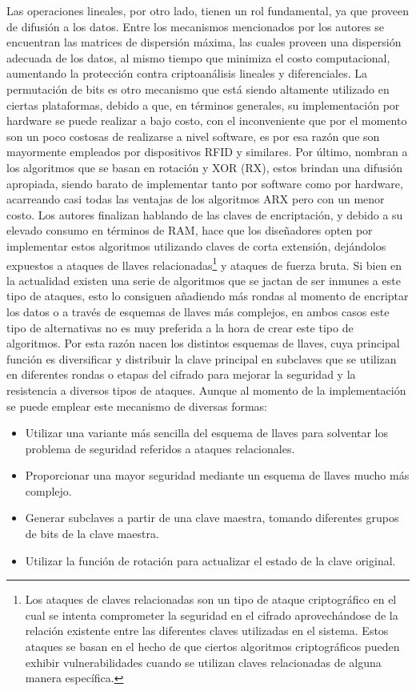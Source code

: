 \documentclass[a4paper,10pt]{article}
\begin{document}
	Las operaciones lineales, por otro lado, tienen un rol fundamental, ya que proveen de difusión a los datos. Entre los mecanismos mencionados por los autores se encuentran las matrices de dispersión máxima, las cuales proveen una dispersión adecuada de los datos, al mismo tiempo que minimiza el costo computacional, aumentando la protección contra criptoanálisis lineales y diferenciales. La permutación de bits es otro mecanismo que está siendo altamente utilizado en ciertas plataformas, debido a que, en términos generales, su implementación por hardware se puede realizar a bajo costo, con el inconveniente que por el momento son un poco costosas de realizarse a nivel software, es por esa razón que son mayormente empleados por dispositivos RFID y similares. Por último, nombran a los algoritmos que se basan en rotación y XOR (RX), estos brindan una difusión apropiada, siendo barato de implementar tanto por software como por hardware, acarreando casi todas las ventajas de los algoritmos ARX pero con un menor costo.
	Los autores finalizan hablando de las claves de encriptación, y debido a su elevado consumo en términos de RAM, hace que los diseñadores opten por implementar estos algoritmos utilizando claves de corta extensión, dejándolos 
	expuestos a ataques de llaves relacionadas\footnote{Los ataques de claves relacionadas son un tipo de ataque criptográfico en el cual se intenta comprometer la seguridad en el cifrado aprovechándose de la relación existente entre las diferentes claves utilizadas en el sistema. Estos ataques se basan en el hecho de que ciertos algoritmos criptográficos pueden exhibir vulnerabilidades cuando se utilizan claves relacionadas de alguna manera específica.} y ataques de fuerza bruta. Si bien en la actualidad existen una serie de algoritmos que se jactan de ser inmunes a este tipo de ataques, esto lo consiguen añadiendo más rondas al momento de encriptar los datos o a través de esquemas de llaves más complejos, en ambos casos este tipo de alternativas no es muy preferida a la hora de crear este tipo de algoritmos. Por esta razón nacen los distintos esquemas de llaves, cuya principal función es diversificar y distribuir la clave principal en subclaves que se utilizan en diferentes rondas o etapas del cifrado para mejorar la seguridad y la resistencia a diversos tipos de ataques. Aunque al momento de la implementación se puede emplear este mecanismo de diversas formas:
	\begin{itemize}
		\item Utilizar una variante más sencilla del esquema de llaves para solventar los problema de seguridad referidos a ataques relacionales.
		\item Proporcionar una mayor seguridad mediante un esquema de llaves mucho más complejo.
		\item Generar subclaves a partir de una clave maestra, tomando diferentes grupos de bits de la clave maestra.
		\item Utilizar la función de rotación para actualizar el estado de la clave original.
	\end{itemize}
\end{document}
